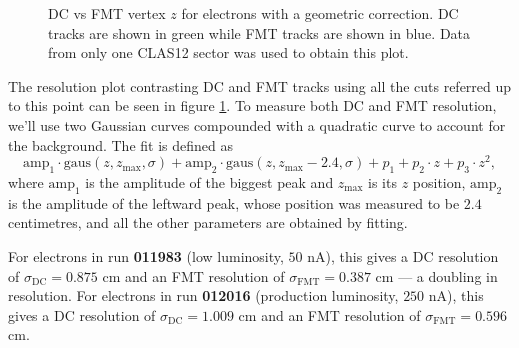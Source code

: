     \begin{figure}[b!]
        \centering{}
        \caption[DC vs FMT $z$ with geometry correction]{DC vs FMT vertex $z$ for electrons with a geometric correction. DC tracks are shown in green while FMT tracks are shown in blue. Data from only one CLAS12 sector was used to obtain this plot.}
        \label{fig::dc_vs_fmt_vz_011983_corrected}
    \end{figure}

    The resolution plot contrasting DC and FMT tracks using all the cuts referred up to this point can be seen in figure \ref{fig::dc_vs_fmt_vz_011983_corrected}.
    To measure both DC and FMT resolution, we'll use two Gaussian curves compounded with a quadratic curve to account for the background.
    The fit is defined as
    \begin{equation*}
        \text{amp}_1 \cdot \text{gaus}(z, z_\text{max}, \sigma) + \text{amp}_2 \cdot \text{gaus}(z, z_\text{max} - 2.4, \sigma) + p_1 + p_2\cdot z + p_3\cdot z^2,
    \end{equation*}
    where $\text{amp}_1$ is the amplitude of the biggest peak and $z_\text{max}$ is its $z$ position, $\text{amp}_2$ is the amplitude of the leftward peak, whose position was measured to be $2.4$ centimetres, and all the other parameters are obtained by fitting.

    For electrons in run \textbf{011983} (low luminosity, $50$ nA), this gives a DC resolution of $\sigma_\text{DC} = 0.875$ cm and an FMT resolution of $\sigma_\text{FMT} = 0.387$ cm --- a doubling in resolution.
    For electrons in run \textbf{012016} (production luminosity, $250$ nA), this gives a DC resolution of $\sigma_\text{DC} = 1.009$ cm and an FMT resolution of $\sigma_\text{FMT} = 0.596$ cm.

